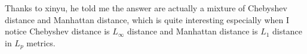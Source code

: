 \documentclass[12pt]{article}
\begin{document}
\begin{center}
\end{center}

Thanks to xinyu, he told me the answer are actually a mixture of Chebyshev distance and Manhattan distance, which is quite interesting especially when I notice Chebyshev distance is $L_{\infty}$ distance and Manhattan distance is $L_{1}$ distance in $L_p$ metrics.
\end{document}
